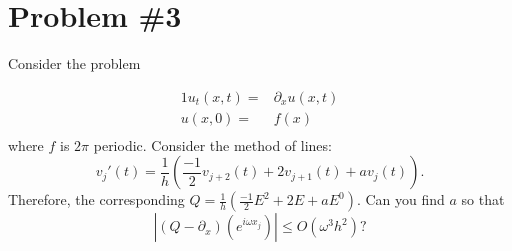 \documentclass[11pt]{amsart}
\numberwithin{equation}{section}
\begin{document}
\newpage
\section{Problem \#3}

Consider the problem

\begin{alignat*}{1}
    u_t(x,t)= & \partial_x u(x,t) \\
    u(x,0)=   & f(x)              \\
\end{alignat*}
where $f$ is  $2 \pi$ periodic.
Consider the method of lines:
\begin{equation*}
    v_j'(t)=\frac{1}{h} (\frac{-1}{2} v_{j+2}(t)+ 2 v_{j+1} (t)+  a v_j(t)). 
\end{equation*}
Therefore, the corresponding $Q= \frac{1}{h}(\frac{-1}{2} E^2+ 2 E+ a E^0)$. Can you find $a$ so that
\begin{equation*}
    |(Q -\partial_x)(e^{i\omega x_j})|\le O(\omega^3 h^2) ?
\end{equation*}
\end{document}
